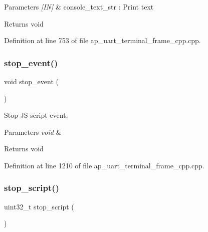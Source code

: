 \begin{DoxyParams}{Parameters}
{\em \mbox{[}\+I\+N\mbox{]}} & console\+\_\+text\+\_\+str \+: Print text \\
\hline
\end{DoxyParams}
\begin{DoxyReturn}{Returns}
void 
\end{DoxyReturn}


Definition at line 753 of file ap\+\_\+uart\+\_\+terminal\+\_\+frame\+\_\+cpp.\+cpp.

\mbox{\label{group___u_a_r_t__terminal_ga61053f5526b385827ac19b86c3df0867}} 
\subsubsection{stop\_event()}
{\footnotesize\ttfamily void stop\+\_\+event (\begin{DoxyParamCaption}\item[{void}]{ }\end{DoxyParamCaption})\hspace{0.3cm}{\ttfamily [static]}}



Stop JS script event. 


\begin{DoxyParams}{Parameters}
{\em void} & \\
\hline
\end{DoxyParams}
\begin{DoxyReturn}{Returns}
void 
\end{DoxyReturn}


Definition at line 1210 of file ap\+\_\+uart\+\_\+terminal\+\_\+frame\+\_\+cpp.\+cpp.

\mbox{\label{group___u_a_r_t__terminal_ga1ef808eaa046bca8db8019bc788a7f3f}} 
\subsubsection{stop\_script()}
{\footnotesize\ttfamily uint32\+\_\+t stop\+\_\+script (\begin{DoxyParamCaption}\item[{void}]{ }\end{DoxyParamCaption})}



